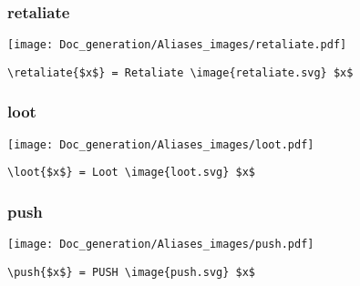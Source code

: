 \documentclass{article}
\begin{document}
\subsubsection{retaliate}
\begin{minipage}{0.45\linewidth}
\raggedright
\begin{spverbatim}
\end{spverbatim}
\end{minipage}
\begin{minipage}{0.45\linewidth}
\raggedleft
\texttt{[image: Doc\_generation/Aliases\_images/retaliate.pdf]}
\end{minipage}
\begin{center}
\begin{BVerbatim}
\retaliate{$x$} = Retaliate \image{retaliate.svg} $x$
\end{BVerbatim}
\end{center}

\subsubsection{loot}
\begin{minipage}{0.45\linewidth}
\raggedright
\begin{spverbatim}
\end{spverbatim}
\end{minipage}
\begin{minipage}{0.45\linewidth}
\raggedleft
\texttt{[image: Doc\_generation/Aliases\_images/loot.pdf]}
\end{minipage}
\begin{center}
\begin{BVerbatim}
\loot{$x$} = Loot \image{loot.svg} $x$
\end{BVerbatim}
\end{center}

\subsubsection{push}
\begin{minipage}{0.45\linewidth}
\raggedright
\begin{spverbatim}
\end{spverbatim}
\end{minipage}
\begin{minipage}{0.45\linewidth}
\raggedleft
\texttt{[image: Doc\_generation/Aliases\_images/push.pdf]}
\end{minipage}
\begin{center}
\begin{BVerbatim}
\push{$x$} = PUSH \image{push.svg} $x$
\end{BVerbatim}
\end{center}
\end{document}
